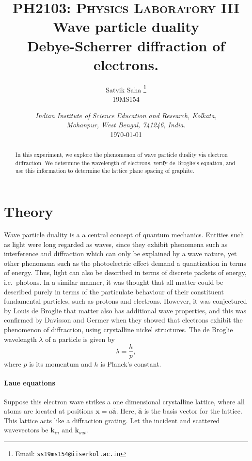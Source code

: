 \documentclass[11pt]{article}
\title{
        \Large\textsc{PH2103: Physics Laboratory III} \\
        \vspace{10pt}
        \Huge \textbf{Wave particle duality} \\
        \vspace{5pt}
        \large{Debye-Scherrer diffraction of electrons.}
}
\author{
        \large Satvik Saha%
        \thanks{Email: \tt ss19ms154@iiserkol.ac.in}
        \\\textsc{\small 19MS154}
}
\date{\normalsize
        \textit{Indian Institute of Science Education and Research, Kolkata, \\
        Mohanpur, West Bengal, 741246, India.} \\
        \vspace{10pt}
        \today
}
\newcommand\bvec[1]{\boldsymbol{#1}}
\newcommand\kk{\bvec{k}}
\newcommand\x{\bvec{x}}
\newcommand\ahat{\bvec{\hat{a}}}
\begin{document}
        \maketitle

        \begin{abstract}
                In this experiment, we explore the phenomenon of wave particle duality via electron diffraction.
                We determine the wavelength of electrons, verify de Broglie's equation, and use this information to determine
                the lattice plane spacing of graphite.
        \end{abstract}
        
        \section{Theory}
        Wave particle duality is a a central concept of quantum mechanics. Entities such as light were long regarded as waves, since they exhibit
        phenomena such as interference and diffraction which can only be explained by a wave nature, yet other phenomena such as
        the photoelectric effect demand a quantization in terms of energy. Thus, light can also be described in terms of discrete packets of
        energy, i.e.\ photons. In a similar manner, it was thought that all matter could be described purely in terms of the particulate behaviour
        of their constituent fundamental particles, such as protons and electrons. However, it was conjectured by Louis de Broglie that
        matter also has additional wave properties, and this was confirmed by Davisson and Germer when they showed that electrons
        exhibit the phenomenon of diffraction, using crystalline nickel structures.
        The de Broglie wavelength $\lambda$ of a particle is given by 
        \[
                \lambda = \frac{h}{p},
        \]
        where $p$ is its momentum and $h$ is Planck's constant.

        \paragraph{Laue equations}
        Suppose this electron wave strikes a one dimensional crystalline lattice, where all atoms are located at positions
        $\x = a\ahat$. Here, $\ahat$ is the basis vector for the lattice. This lattice acts like a diffraction grating.
        Let the incident and scattered wavevectors be $\kk_{in}$ and $\kk_{out}$.
        
\end{document}
